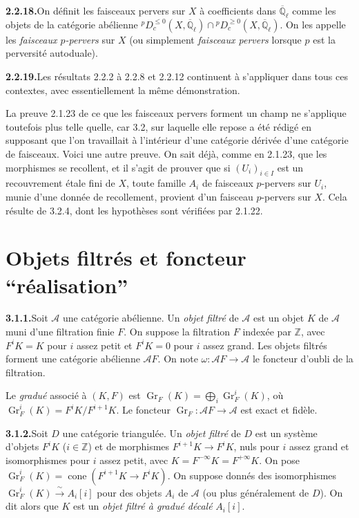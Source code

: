 \documentclass[12pt,a4paper]{article}
\theoremstyle{plain}
\theoremstyle{definition}
\DeclareMathOperator{\Gr}{Gr}
\DeclareMathOperator{\cone}{cone}
\begin{document}
\smallskip
\noindent\textbf{2.2.18.}\quad On d\'efinit les faisceaux pervers sur $X$ \`a coefficients dans $\overline{\mathbb{Q}}_\ell$ comme les objets de la cat\'egorie ab\'elienne ${}^p D_c^{\leqslant 0}(X, \overline{\mathbb{Q}}_\ell) \cap {}^p D_c^{\geqslant 0}(X, \overline{\mathbb{Q}}_\ell)$. On les appelle les \emph{faisceaux $p$-pervers} sur $X$ (ou simplement \emph{faisceaux pervers} lorsque $p$ est la perversit\'e autoduale).

\smallskip
\noindent\textbf{2.2.19.}\quad Les r\'esultats 2.2.2 \`a 2.2.8 et 2.2.12 continuent \`a s'appliquer dans tous ces contextes, avec essentiellement la m\^eme d\'emonstration.

La preuve 2.1.23 de ce que les faisceaux pervers forment un champ ne s'applique toutefois plus telle quelle, car 3.2, sur laquelle elle repose a \'et\'e r\'edig\'e en supposant que l'on travaillait \`a l'int\'erieur d'une cat\'egorie d\'eriv\'ee d'une cat\'egorie de faisceaux. Voici une autre preuve. On sait d\'ej\`a, comme en 2.1.23, que les morphismes se recollent, et il s'agit de prouver que si $(U_i)_{i \in I}$ est un recouvrement \'etale fini de $X$, toute famille $A_i$ de faisceaux $p$-pervers sur $U_i$, munie d'une donn\'ee de recollement, provient d'un faisceau $p$-pervers sur $X$. Cela r\'esulte de 3.2.4, dont les hypoth\`eses sont v\'erifi\'ees par 2.1.22.

\section{Objets filtr\'es et foncteur ``r\'ealisation''}

\noindent\textbf{3.1.1.}\quad Soit $\mathcal{A}$ une cat\'egorie ab\'elienne. Un \emph{objet filtr\'e} de $\mathcal{A}$ est un objet $K$ de $\mathcal{A}$ muni d'une filtration finie $F$. On suppose la filtration $F$ index\'ee par $\mathbb{Z}$, avec $F^i K = K$ pour $i$ assez petit et $F^i K = 0$ pour $i$ assez grand. Les objets filtr\'es forment une cat\'egorie ab\'elienne $\mathcal{A}F$. On note $\omega : \mathcal{A}F \to \mathcal{A}$ le foncteur d'oubli de la filtration.

Le \emph{gradu\'e} associ\'e \`a $(K, F)$ est $\Gr_F(K) = \bigoplus_i \Gr_F^i(K)$, o\`u $\Gr_F^i(K) = F^i K / F^{i+1} K$. Le foncteur $\Gr_F : \mathcal{A}F \to \mathcal{A}$ est exact et fid\`ele.

\smallskip
\noindent\textbf{3.1.2.}\quad Soit $D$ une cat\'egorie triangul\'ee. Un \emph{objet filtr\'e} de $D$ est un syst\`eme d'objets $F^i K$ ($i \in \mathbb{Z}$) et de morphismes $F^{i+1} K \to F^i K$, nuls pour $i$ assez grand et isomorphismes pour $i$ assez petit, avec $K = F^{-\infty} K = F^{+\infty} K$. On pose $\Gr_F^i(K) = \cone(F^{i+1} K \to F^i K)$. On suppose donn\'es des isomorphismes $\Gr_F^i(K) \xrightarrow{\;\sim\;} A_i[i]$ pour des objets $A_i$ de $\mathcal{A}$ (ou plus g\'en\'eralement de $D$). On dit alors que $K$ est un \emph{objet filtr\'e \`a gradu\'e d\'ecal\'e} $A_i[i]$.
\end{document}
